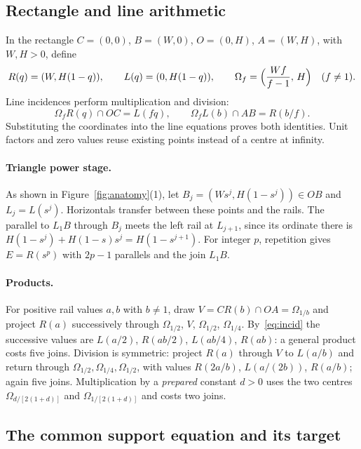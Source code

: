 \documentclass[10pt,a4paper]{article}
\theoremstyle{plain}
\theoremstyle{remark}
\numberwithin{equation}{section}
\newcommand{\Om}{\Omega}              %
\begin{document}
\subsection{Rectangle and line arithmetic}\label{sec:rect}

In the rectangle $C=(0,0)$, $B=(W,0)$, $O=(0,H)$, $A=(W,H)$, with $W,H>0$, define
\begin{equation}\label{eq:rails}
R(q)=(W,H(1-q)),\qquad L(q)=(0,H(1-q)),\qquad \Om_f=\Bigl(\frac{Wf}{f-1},\,H\Bigr)\quad(f\neq 1).
\end{equation}
Line incidences perform multiplication and division:
\begin{equation}\label{eq:incid}
\Om_fR(q)\cap OC=L(fq),\qquad \Om_fL(b)\cap AB=R(b/f).
\end{equation}
Substituting the coordinates into the line equations proves both identities. Unit factors and zero
values reuse existing points instead of a centre at infinity.

\paragraph{Triangle power stage.}
As shown in Figure~\ref{fig:anatomy}(1), let $B_j=(Ws^{j},H(1-s^{j}))\in OB$ and $L_j=L(s^{j})$.
Horizontals transfer between these points and the rails. The parallel to $L_1B$ through $B_j$ meets the
left rail at $L_{j+1}$, since its ordinate there is $H(1-s^{j})+H(1-s)s^{j}=H(1-s^{j+1})$. For integer
$p$, repetition gives $E=R(s^{p})$ with $2p-1$ parallels and the join $L_1B$.

\paragraph{Products.}
For positive rail values $a,b$ with $b\neq 1$, draw $V=CR(b)\cap OA=\Om_{1/b}$ and project $R(a)$
successively through $\Om_{1/2}$, $V$, $\Om_{1/2}$, $\Om_{1/4}$. By~\eqref{eq:incid} the successive
values are $L(a/2)$, $R(ab/2)$, $L(ab/4)$, $R(ab)$: a general product costs five joins. Division is
symmetric: project $R(a)$ through $V$ to $L(a/b)$ and return through $\Om_{1/2},\Om_{1/4},\Om_{1/2}$,
with values $R(2a/b)$, $L(a/(2b))$, $R(a/b)$; again five joins. Multiplication by a \emph{prepared}
constant $d>0$ uses the two centres $\Om_{d/[2(1+d)]}$ and $\Om_{1/[2(1+d)]}$ and costs two joins.

\subsection{The common support equation and its target}
\end{document}
